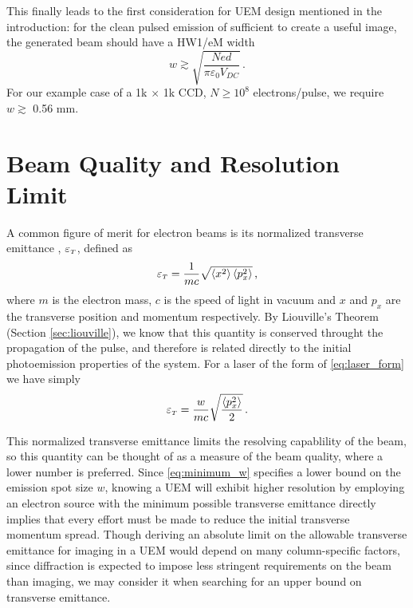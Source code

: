 This finally leads to the first consideration for UEM design mentioned in the introduction: for the clean pulsed emission of sufficient to create a useful image, the generated beam should have a HW1/eM width 
\begin{equation} \label{eq:minimum_w}
  w \gtrsim \sqrt{\frac{N e d}{\pi \varepsilon_0 V_{DC}}} \,\text{.}
\end{equation}
For our example case of a 1k $\times$ 1k CCD, $N \ge 10^8$ electrons/pulse, we require $w \gtrsim $ 0.56 mm.

\section{Beam Quality and Resolution Limit}

A common figure of merit for electron beams is its normalized transverse emittance \cite{jensen_emittance_2010}, $\varepsilon_{{\scriptscriptstyle T}}$, defined as 
\begin{equation} \label{eq:emittance_definition}
  \varepsilon_{{\scriptscriptstyle T}} = \frac{1}{m c} \sqrt{ \left < x^2 \right > \left < p_x^2 \right > } \,\text{,}
\end{equation}
where $m$ is the electron mass, $c$ is the speed of light in vacuum and $x$ and $p_x$ are the transverse position and momentum respectively.
By Liouville's Theorem (Section \ref{sec:liouville}), we know that this quantity is conserved throught the propagation of the pulse, and therefore is related directly to the initial photoemission properties of the system.
For a laser of the form of \ref{eq:laser_form} we have simply
\begin{equation} \label{eq:emittance_definition_w}
  \varepsilon_{{\scriptscriptstyle T}} = \frac{w}{m c} \sqrt{ \frac{\left < p_x^2 \right >}{2} } \,\text{.}
\end{equation}

This normalized transverse emittance limits the resolving capablility of the beam, so this quantity can be thought of as a measure of the beam quality, where a lower number is preferred.
Since \ref{eq:minimum_w} specifies a lower bound on the emission spot size $w$, knowing a UEM will exhibit higher resolution by employing an electron source with the minimum possible transverse emittance directly implies that every effort must be made to reduce the initial transverse momentum spread.
Though deriving an absolute limit on the allowable transverse emittance for imaging in a UEM would depend on many column-specific factors, since diffraction is expected to impose less stringent requirements on the beam than imaging, we may consider it when searching for an upper bound on transverse emittance.

